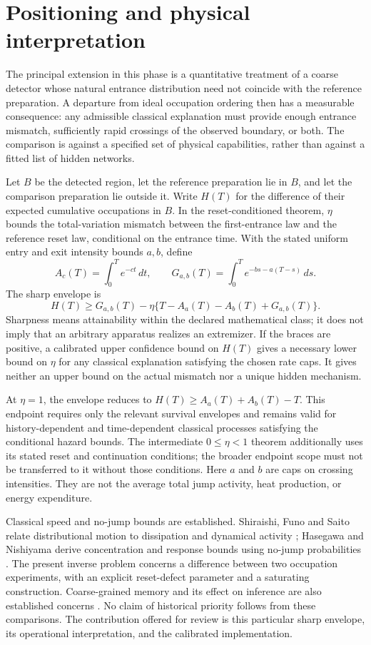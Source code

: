 \section{Positioning and physical interpretation}

The principal extension in this phase is a quantitative treatment of a
coarse detector whose natural entrance distribution need not coincide with the
reference preparation. A departure from ideal occupation ordering then has a
measurable consequence: any admissible classical explanation must provide enough
entrance mismatch, sufficiently rapid crossings of the observed boundary, or
both. The comparison is against a specified set of physical capabilities, rather
than against a fitted list of hidden networks.

Let $B$ be the detected region, let the reference preparation lie in $B$, and let
the comparison preparation lie outside it. Write $H(T)$ for the difference of
their expected cumulative occupations in $B$. In the reset-conditioned theorem,
$\eta$ bounds the total-variation mismatch between the first-entrance law and
the reference reset law, conditional on the entrance time. With the stated
uniform entry and exit intensity bounds $a,b$, define
\[
 A_c(T)=\int_0^T e^{-ct}\,dt,\qquad
 G_{a,b}(T)=\int_0^T e^{-bs-a(T-s)}\,ds.
\]
The sharp envelope is
\[
 H(T)\ge G_{a,b}(T)
 -\eta\{T-A_a(T)-A_b(T)+G_{a,b}(T)\}.
\]
Sharpness means attainability within the declared mathematical class; it does
not imply that an arbitrary apparatus realizes an extremizer. If the braces
are positive, a calibrated upper confidence bound on $H(T)$ gives a necessary
lower bound on $\eta$ for any classical explanation satisfying the chosen rate
caps. It gives neither an upper bound on the actual mismatch nor a unique hidden
mechanism.

At $\eta=1$, the envelope reduces to
$H(T)\ge A_a(T)+A_b(T)-T$. This endpoint requires only the relevant survival
envelopes and remains valid for history-dependent and time-dependent classical
processes satisfying the conditional hazard bounds. The intermediate
$0\le\eta<1$ theorem additionally uses its stated reset and continuation
conditions; the broader endpoint scope must not be transferred to it without
those conditions. Here $a$ and $b$ are caps on crossing intensities. They are not
the average total jump activity, heat production, or energy expenditure.

Classical speed and no-jump bounds are established. Shiraishi, Funo and Saito
relate distributional motion to dissipation and dynamical activity
\cite{rrShiraishi2018}; Hasegawa and Nishiyama derive concentration and response
bounds using no-jump probabilities \cite{rrHasegawa2024}. The present inverse
problem concerns a difference between two occupation experiments, with an
explicit reset-defect parameter and a saturating construction. Coarse-grained
memory and its effect on inference are also established concerns
\cite{rrBlom2024}. No claim of historical priority follows from these
comparisons. The contribution offered for review is this particular sharp
envelope, its operational interpretation, and the calibrated implementation.

